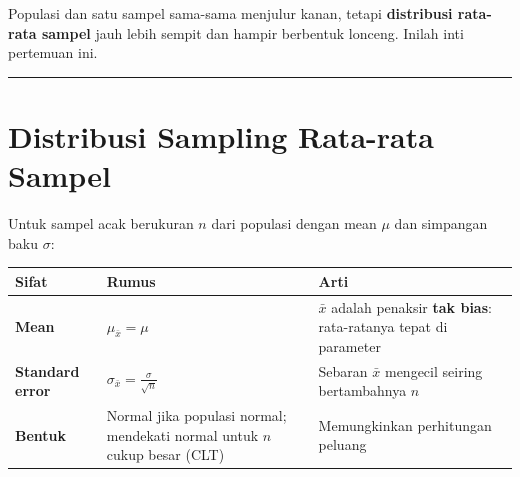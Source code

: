 \documentclass[
  indonesian,
  letterpaper,
]{book}
\newcounter{none} %
\begin{document}
Populasi dan satu sampel sama-sama menjulur kanan, tetapi
\textbf{distribusi rata-rata sampel} jauh lebih sempit dan hampir
berbentuk lonceng. Inilah inti pertemuan ini.

\begin{center}\rule{0.5\linewidth}{0.5pt}\end{center}


\chapter{Distribusi Sampling Rata-rata
Sampel}\label{distribusi-sampling-rata-rata-sampel}

Untuk sampel acak berukuran \(n\) dari populasi dengan mean \(\mu\) dan
simpangan baku \(\sigma\):

{\def\LTcaptype{none} %
\begin{longtable}[]{@{}
  >{\raggedright\arraybackslash}p{}
  >{\raggedright\arraybackslash}p{}
  >{\raggedright\arraybackslash}p{}@{}}
\toprule\noalign{}
\begin{minipage}[b]{\linewidth}\raggedright
Sifat
\end{minipage} & \begin{minipage}[b]{\linewidth}\raggedright
Rumus
\end{minipage} & \begin{minipage}[b]{\linewidth}\raggedright
Arti
\end{minipage} \\
\midrule\noalign{}
\endhead
\bottomrule\noalign{}
\endlastfoot
\textbf{Mean} & \(\mu_{\bar{x}} = \mu\) & \(\bar{x}\) adalah penaksir
\textbf{tak bias}: rata-ratanya tepat di parameter \\
\textbf{Standard error} & \(\sigma_{\bar{x}} = \frac{\sigma}{\sqrt{n}}\)
& Sebaran \(\bar{x}\) mengecil seiring bertambahnya \(n\) \\
\textbf{Bentuk} & Normal jika populasi normal; mendekati normal untuk
\(n\) cukup besar (CLT) & Memungkinkan perhitungan peluang \\
\end{longtable}
}
\end{document}
